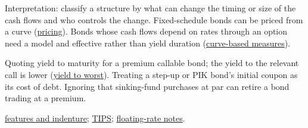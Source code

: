 \begin{qfdefinition}
 Interpretation: classify a structure by what can change the timing or size of the cash flows and who controls the change. Fixed-schedule bonds can be priced from a curve (\hyperref[meth:bond-price-from-yield]{pricing}). Bonds whose cash flows depend on rates through an option need a model and effective rather than yield duration (\hyperref[meth:curve-based-empirical-duration]{curve-based measures}).

 Quoting yield to maturity for a premium callable bond; the yield to the relevant call is lower (\hyperref[def:bond-yield-spread-measures]{yield to worst}). Treating a step-up or PIK bond's initial coupon as its cost of debt. Ignoring that sinking-fund purchases at par can retire a bond trading at a premium.

 \hyperref[def:bond-features-indenture]{features and indenture}; \hyperref[def:tips-breakevens]{TIPS}; \hyperref[meth:floating-money-market-yields]{floating-rate notes}.

\end{qfdefinition}

